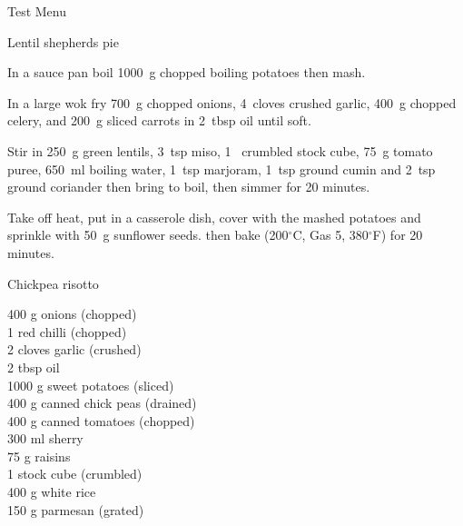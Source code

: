 \begin{menu}{Test Menu}
\begin{recipe}{2}{Lentil shepherds pie}
	
    \begin{instructions}
    \item 
        In a sauce pan boil
        1000~g chopped boiling potatoes
        then mash.
      \item 
        In a large wok fry
        700~g chopped onions,
        4~cloves crushed garlic,
        400~g chopped celery,
        and
        200~g sliced carrots
        in
        2~tbsp  oil
        until soft.
      \item 
        Stir in
        250~g  green lentils,
        3~tsp  miso,
        1~ crumbled stock cube,
        75~g  tomato puree,
        650~ml  boiling water,
        1~tsp  marjoram,
        1~tsp  ground cumin
        and
        2~tsp  ground coriander
        then bring to boil,
        then simmer for 20 minutes.
      \item 
        Take off heat,
        put in a casserole dish,
        cover with the mashed potatoes
        and sprinkle with
        50~g  sunflower seeds.
        then bake 
      (200$^{\circ}$C, Gas 5, 380$^{\circ}$F)
     for 20 minutes.
      
    \end{instructions}
    \end{recipe}%
  
    \begin{recipe}{2}{Chickpea risotto}%
    
		\begin{ingredients}
		400 g onions (chopped) \\
	1  red chilli (chopped) \\
	2 cloves garlic (crushed) \\
	2 tbsp oil  \\
	1000 g sweet potatoes (sliced) \\
	400 g canned chick peas (drained) \\
	400 g canned tomatoes (chopped) \\
	300 ml sherry  \\
	75 g raisins  \\
	1  stock cube (crumbled) \\
	400 g white rice  \\
	150 g parmesan (grated) \\
	
		\end{ingredients}
	

\end{recipe}
\end{menu}
